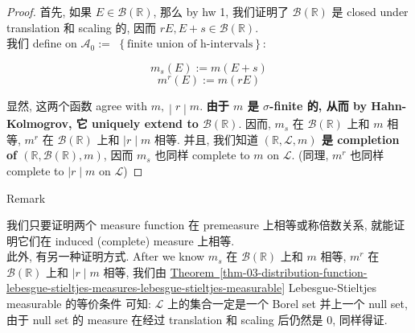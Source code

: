 \documentclass{qlnotes-export}
\begin{document}
\begin{proof}

首先, 如果 \(E \in \mathcal{B}({\mathbb{R}})\), 那么 by hw 1, 我们证明了 \(\mathcal{B}({\mathbb{R}})\) 是 closed under translation 和 scaling 的, 因而 \(rE,E + s \in \mathcal{B}({\mathbb{R}})\).\\
我们 define on \(\mathcal{A}_{0} :=\) \(\left\{ \text{finite union of h-intervals} \right\}\):

\[m_{s}(E) := m(E + s)\]\[m^{r}(E) := m(rE)\]

显然, 这两个函数 agree with \(\left. m, \middle| r \middle| m \right.\). \textbf{由于 \(m\) 是 \(\sigma\)-finite 的, 从而 by Hahn-Kolmogrov, 它 uniquely extend to \(\mathcal{B}({\mathbb{R}})\)}. 因而, \(m_{s}\) 在 \(\mathcal{B}({\mathbb{R}})\) 上和 \(m\) 相等, \(m^{r}\) 在 \(\mathcal{B}({\mathbb{R}})\) 上和 \(\left. |r \middle| m \right.\) 相等. 并且, 我们知道 \textbf{\(({\mathbb{R}},\mathcal{L},m)\) 是 completion of \(({\mathbb{R}},\mathcal{B}({\mathbb{R}}),m)\)}, 因而 \(m_{s}\) 也同样 complete to \(m\) on \(\mathcal{L}\). (同理, \(m^{r}\) 也同样 complete to \(\left. |r \middle| m \right.\) on \(\mathcal{L}\))

\end{proof}

\begin{qlremark}{Remark}

我们只要证明两个 measure function 在 premeasure 上相等或称倍数关系, 就能证明它们在 induced (complete) measure 上相等.\\
此外, 有另一种证明方式. After we know \(m_{s}\) 在 \(\mathcal{B}({\mathbb{R}})\) 上和 \(m\) 相等, \(m^{r}\) 在 \(\mathcal{B}({\mathbb{R}})\) 上和 \(\left. |r \middle| m \right.\) 相等, 我们由 \hyperref[thm-03-distribution-function-lebesgue-stieltjes-measures-lebesgue-stieltjes-measurable]{Theorem~\ref*{thm-03-distribution-function-lebesgue-stieltjes-measures-lebesgue-stieltjes-measurable}} Lebesgue-Stieltjes measurable 的等价条件 可知: \(\mathcal{L}\) 上的集合一定是一个 Borel set 并上一个 null set, 由于 null set 的 measure 在经过 translation 和 scaling 后仍然是 0, 同样得证.

\end{qlremark}
\end{document}
